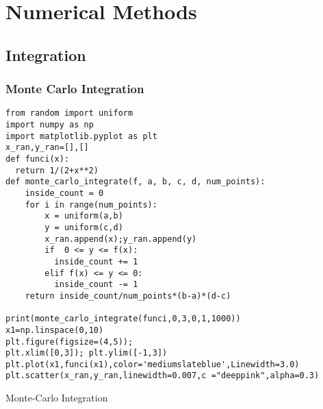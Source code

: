\chapter{Numerical Methods}
\section{Integration}
\subsection{Monte Carlo Integration}
\begin{listing}[ht!]
\begin{verbatim}
from random import uniform
import numpy as np
import matplotlib.pyplot as plt
x_ran,y_ran=[],[]
def funci(x):
  return 1/(2+x**2)  
def monte_carlo_integrate(f, a, b, c, d, num_points):
    inside_count = 0
    for i in range(num_points):
        x = uniform(a,b)
        y = uniform(c,d)
        x_ran.append(x);y_ran.append(y)
        if  0 <= y <= f(x):
          inside_count += 1
        elif f(x) <= y <= 0:
          inside_count -= 1
    return inside_count/num_points*(b-a)*(d-c)

print(monte_carlo_integrate(funci,0,3,0,1,1000))
x1=np.linspace(0,10)
plt.figure(figsize=(4,5));
plt.xlim([0,3]); plt.ylim([-1,3])
plt.plot(x1,funci(x1),color='mediumslateblue',Linewidth=3.0)
plt.scatter(x_ran,y_ran,linewidth=0.007,c ="deeppink",alpha=0.3)
\end{verbatim}
\caption{Monte-Carlo Integration}
\label{listing :1}
\end{listing}
